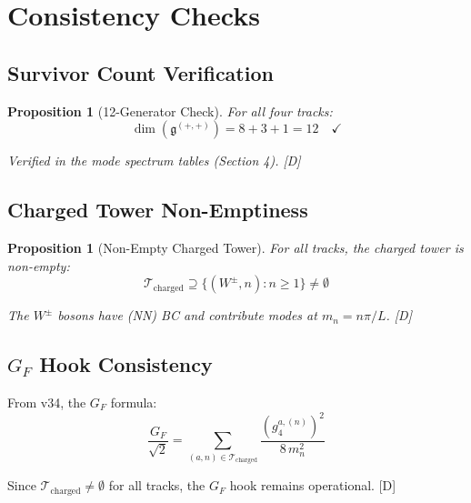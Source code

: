 \documentclass[11pt,a4paper]{article}
\newtheorem{proposition}[theorem]{Proposition}
\newcommand{\tagD}{\textcolor{blue!70!black}{[D]}}
\begin{document}
\section{Consistency Checks}

\subsection{Survivor Count Verification}

\begin{proposition}[12-Generator Check]
\label{prop:12-check}
For all four tracks:
\begin{equation}
\label{eq:12-verify}
\dim(\mathfrak{g}^{(+,+)}) = 8 + 3 + 1 = 12 \quad \checkmark
\end{equation}

Verified in the mode spectrum tables (Section 4). \tagD
\end{proposition}

\subsection{Charged Tower Non-Emptiness}

\begin{proposition}[Non-Empty Charged Tower]
\label{prop:charged-tower}
For all tracks, the charged tower is non-empty:
\begin{equation}
\label{eq:charged-nonempty}
\mathcal{T}_{\text{charged}} \supseteq \{(W^\pm, n) : n \geq 1\} \neq \emptyset
\end{equation}

The $W^\pm$ bosons have (NN) BC and contribute modes at $m_n = n\pi/L$. \tagD
\end{proposition}

\subsection{$G_F$ Hook Consistency}

From v34, the $G_F$ formula:
\begin{equation}
\label{eq:gf-hook}
\frac{G_F}{\sqrt{2}} = \sum_{(a,n) \in \mathcal{T}_{\text{charged}}} \frac{(g_4^{a,(n)})^2}{8\, m_n^2}
\end{equation}

Since $\mathcal{T}_{\text{charged}} \neq \emptyset$ for all tracks, the $G_F$ hook remains
operational. \tagD
\end{document}
